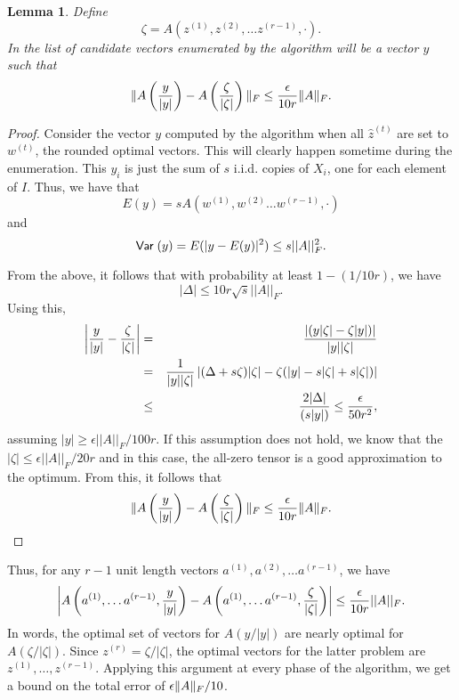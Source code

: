 \documentclass{book}
\newtheorem{lemma}[theorem]{Lemma}
\numberwithin{exercise}{chapter}
\begin{document}
\begin{lemma}\label{lem:tensor-sampling-error}
Define
\[
\zeta = A(z^{(1)},z^{(2)},\ldots z^{(r-1)},\cdot).
\]
In the list of candidate vectors enumerated by the algorithm will be a vector $y$ such that
\[
\|A\left( {y\over|y|} \right)- A\left({\zeta \over |\zeta|}\right)\|_F\leq \frac{\epsilon}{10r} \|A\|_F.
\]
\end{lemma}

\begin{proof}
Consider
the vector $y$ computed by the algorithm when all $\hat z^{(t)}$ are set to
$w^{(t)}$, the rounded optimal vectors.
This will clearly happen sometime during the enumeration.
This $y_i$ is
just the sum of $s$ i.i.d. copies of $X_i$, one for each element of $I$.
Thus, we have that
$$E(y) = s A(w^{(1)},w^{(2)}\ldots w^{(r-1)},\cdot )$$
and
$$\hbox{\sf Var\;} (y) = E( |y-E(y)|^2) \leq s ||A||_F^2.$$

From the above, it follows that with probability
at least $1-(1/10r)$, we have
$$|\Delta |\leq  10r\sqrt s ||A||_F.$$
Using this,
\begin{eqnarray*}
\left| {y\over |y|}-{\zeta \over |\zeta |}\right| &=&
\frac{\left| (y|\zeta |-\zeta |y|)\right|}{|y||\zeta |} \\
&=& {1\over |y||\zeta |}
\left| (\Delta + s\zeta )|\zeta |-\zeta (|y|-s|\zeta |+s|\zeta |)\right|\\
&\leq& \frac{2|\Delta|}{(s|y|)} \leq \frac{\epsilon}{50r^2},
\end{eqnarray*}
assuming $|y |\geq \epsilon ||A||_F/100r$. If this
assumption does not hold,
we know that the $|\zeta |\leq \epsilon ||A||_F/20r$
and in this case, the all-zero tensor
is a good approximation to the optimum.
From this, it follows that
$$\|A\left( {y\over|y|} \right)- A\left({\zeta \over |\zeta|}\right)\|_F\leq \frac{\epsilon}{10r} \|A\|_F.$$
\end{proof}

Thus, for any $r-1$ unit length
vectors $a^{(1)},a^{(2)},\ldots a^{(r-1)}$, we have
$$\left| A\left(a^{(1)},\ldots a^{(r-1)},{y\over |y|}\right)-
A\left( a^{(1)},\ldots a^{(r-1)}, {\zeta \over |\zeta| }\right)\right|
\leq \frac{\epsilon}{10r} ||A||_F.$$
In words, the optimal set of vectors for $A(y/|y|)$
are nearly optimal for $A(\zeta / |\zeta |)$.
Since $z^{(r)} = \zeta/|\zeta|$,
the optimal vectors for the latter problem are $z^{(1)}, \ldots, z^{(r-1)}$. Applying this argument at every phase of the algorithm, we get a bound on the total error of $\epsilon\|A\|_F/10$.
\end{document}
